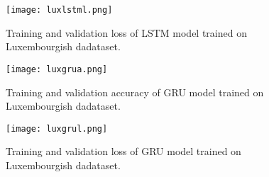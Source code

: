 \begin{figure}[h]
  \centering
  \texttt{[image: luxlstml.png]}
  \caption{Training and validation loss of LSTM model trained on Luxembourgish
  dadataset.}
\end{figure}

\begin{figure}[h]
  \centering
  \texttt{[image: luxgrua.png]}
  \caption{Training and validation accuracy of GRU model trained on Luxembourgish
  dadataset.}
\end{figure}

\begin{figure}[h]
  \centering
  \texttt{[image: luxgrul.png]}
  \caption{Training and validation loss of GRU model trained on Luxembourgish
  dadataset.}
\end{figure}
